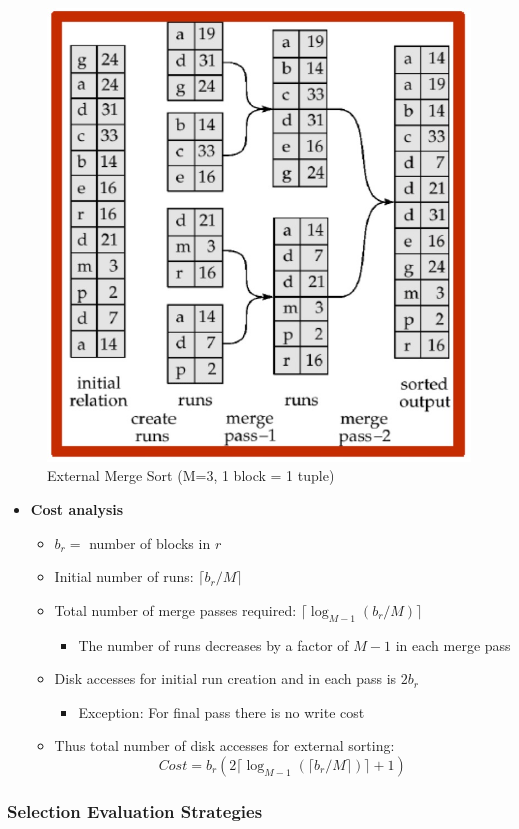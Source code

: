 \begin{figure}[H]
    \centering
    \includegraphics[width=0.5\linewidth]{images/Screenshot 2024-05-25 at 11.58.54.jpg}
    \caption{External Merge Sort (M=3, 1 block = 1 tuple)}
\end{figure}
\begin{itemize}[label=\(\rhd\)]
    \item \textbf{Cost analysis}
    \begin{itemize}[label=\(\rhd\)]
        \item $b_r=$ number of blocks in $r$
        \item Initial number of runs: $\lceil b_r/M\rceil$
        \item Total number of merge passes required: $\lceil \log _{M-1}(b_r/M)\rceil$
        \begin{itemize}[label=\(\rhd\)]
            \item The number of runs decreases by a factor of $M-1$ in each merge pass
        \end{itemize}
        \item Disk accesses for initial run creation and in each pass is $2b_r$
        \begin{itemize}[label=\(\rhd\)]
            \item Exception: For final pass there is no write cost 
        \end{itemize}
        \item Thus total number of disk accesses for external sorting:\[
        Cost=b_r(2 \lceil \log_{M-1} (\lceil b_r/M\rceil ) \rceil +1)
        \]
    \end{itemize}
\end{itemize}


\subsubsection{Selection Evaluation Strategies}

